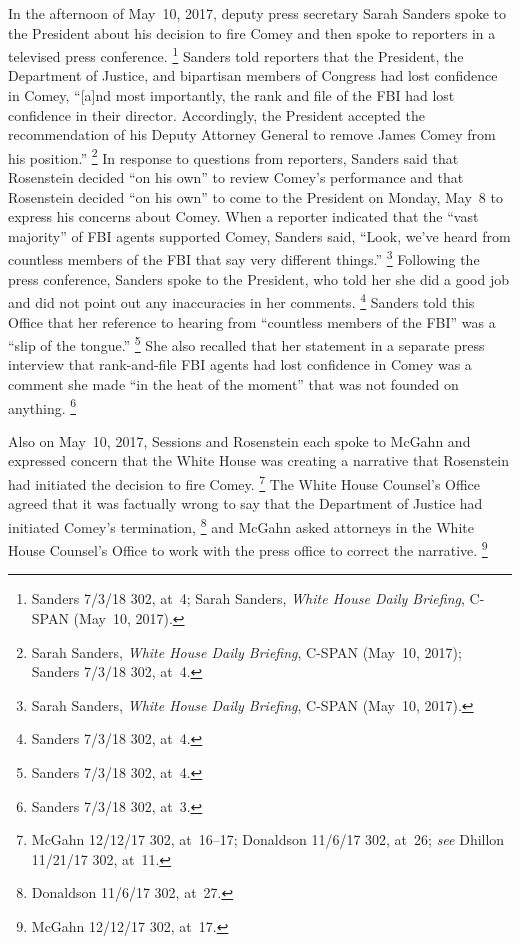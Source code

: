 In the afternoon of May~10, 2017, deputy press secretary Sarah Sanders spoke to the President about his decision to fire Comey and then spoke to reporters in a televised press conference.%
\footnote{Sanders 7/3/18 302, at~4;
Sarah Sanders, \textit{White House Daily Briefing}, C-SPAN (May~10, 2017).}
Sanders told reporters that the President, the Department of Justice, and bipartisan members of Congress had lost confidence in Comey, ``[a]nd most importantly, the rank and file of the FBI had lost confidence in their director.
Accordingly, the President accepted the recommendation of his Deputy Attorney General to remove James Comey from his position.''%
\footnote{Sarah Sanders, \textit{White House Daily Briefing}, C-SPAN (May~10, 2017);
Sanders 7/3/18 302, at~4.}
In response to questions from reporters, Sanders said that Rosenstein decided ``on his own'' to review Comey's performance and that Rosenstein decided ``on his own'' to come to the President on Monday, May~8 to express his concerns about Comey.
When a reporter indicated that the ``vast majority'' of FBI agents supported Comey, Sanders said, ``Look, we've heard from countless members of the FBI that say very different things.''%
\footnote{Sarah Sanders, \textit{White House Daily Briefing}, C-SPAN (May~10, 2017).}
Following the press conference, Sanders spoke to the President, who told her she did a good job and did not point out any inaccuracies in her comments.%
\footnote{Sanders 7/3/18 302, at~4.}
Sanders told this Office that her reference to hearing from ``countless members of the FBI'' was a ``slip of the tongue.''%
\footnote{Sanders 7/3/18 302, at~4.}
She also recalled that her statement in a separate press interview that rank-and-file FBI agents had lost confidence in Comey was a comment she made ``in the heat of the moment'' that was not founded on anything.%
\footnote{Sanders 7/3/18 302, at~3.}

Also on May~10, 2017, Sessions and Rosenstein each spoke to McGahn and expressed concern that the White House was creating a narrative that Rosenstein had initiated the decision to fire Comey.%
\footnote{McGahn 12/12/17 302, at~16--17;
Donaldson 11/6/17 302, at~26;
\textit{see} Dhillon 11/21/17 302, at~11.}
The White House Counsel's Office agreed that it was factually wrong to say that the Department of Justice had initiated Comey's termination,%
\footnote{Donaldson 11/6/17 302, at~27.}
and McGahn asked attorneys in the White House Counsel's Office to work with the press office to correct the narrative.%
\footnote{McGahn 12/12/17 302, at~17.}

